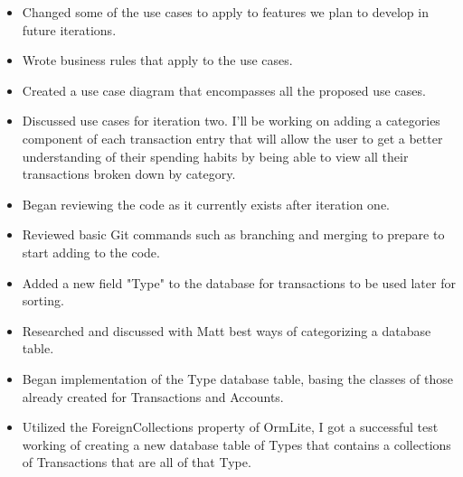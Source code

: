 \documentclass{article}
\begin{document}
	\begin{itemize}
		\item Changed some of the use cases to apply to features we plan to develop in 					future iterations.
		\item Wrote business rules that apply to the use cases.
		\item Created a use case diagram that encompasses all the proposed use cases.
	\end{itemize}
	
	\begin{itemize}
		\item Discussed use cases for iteration two. I'll be working on adding a 						categories component of each transaction entry that will allow the user to 					get a better understanding of their spending habits by being able to view 					all their transactions broken down by category. 
	\end{itemize}
	
	\begin{itemize}
		\item Began reviewing the code as it currently exists after iteration one.
		\item Reviewed basic Git commands such as branching and merging to prepare to 					start adding to the code. 
	\end{itemize}
	
	\begin{itemize}
		\item Added a new field "Type" to the database for transactions to be used later 			for sorting.
		\item Researched and discussed with Matt best ways of categorizing a database 					table. 
	\end{itemize}
	
	\begin{itemize}
		\item Began implementation of the Type database table, basing the classes of 					those already created for Transactions and Accounts.
		\item Utilized the ForeignCollections property of OrmLite, I got a successful 					test working of creating a new database table of Types that contains a 						collections of Transactions that are all of that Type.
	\end{itemize}
	
\end{document}
